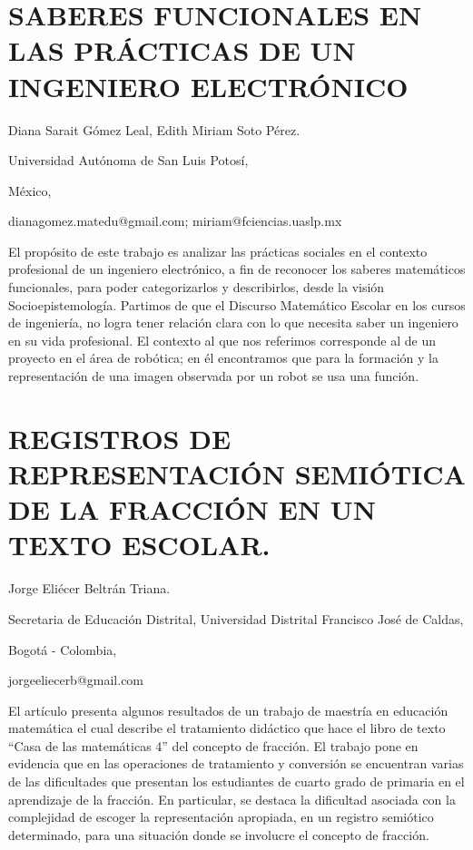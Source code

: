 \setcounter{section}{216}


\section{SABERES FUNCIONALES EN LAS PRÁCTICAS DE UN INGENIERO ELECTRÓNICO}

\begin{datos}

Diana Sarait Gómez Leal, Edith Miriam Soto Pérez.

Universidad Autónoma de San Luis Potosí,

México,

dianagomez.matedu@gmail.com; miriam@fciencias.uaslp.mx

\end{datos}

El propósito de este trabajo es analizar las prácticas sociales en
el contexto profesional de un ingeniero electrónico, a fin de reconocer
los saberes matemáticos funcionales, para poder categorizarlos y describirlos,
desde la visión Socioepistemología. Partimos de que el Discurso Matemático
Escolar en los cursos de ingeniería, no logra tener relación clara
con lo que necesita saber un ingeniero en su vida profesional. El
contexto al que nos referimos corresponde al de un proyecto en el
área de robótica; en él encontramos que para la formación y la representación
de una imagen observada por un robot se usa una función.


\section{REGISTROS DE REPRESENTACIÓN SEMIÓTICA DE LA FRACCIÓN EN UN TEXTO
ESCOLAR.}

\begin{datos}

Jorge Eliécer Beltrán Triana. 

Secretaria de Educación Distrital, Universidad Distrital Francisco
José de Caldas,

Bogotá - Colombia,

jorgeeliecerb@gmail.com 

\end{datos}

El artículo presenta algunos resultados de un trabajo de maestría
en educación matemática el cual describe el tratamiento didáctico
que hace el libro de texto “Casa de las matemáticas 4” del concepto
de fracción. El trabajo pone en evidencia que en las operaciones de
tratamiento y conversión se encuentran varias de las dificultades
que presentan los estudiantes de cuarto grado de primaria en el aprendizaje
de la fracción. En particular, se destaca la dificultad asociada con
la complejidad de escoger la representación apropiada, en un registro
semiótico determinado, para una situación donde se involucre el concepto
de fracción.


